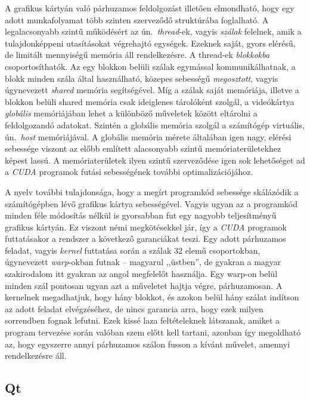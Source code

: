 \documentclass[a4paper,12pt]{article}
\begin{document}
A grafikus kártyán való párhuzamos feldolgozást illetően elmondható, hogy egy adott munkafolyamat több szinten szerveződő struktúrába foglalható.  A legalacsonyabb szintű működésért az ún.\ \emph{thread}-ek, vagyis \emph{szálak} felelnek, amik a tulajdonképpeni utasításokat végrehajtó egységek. Ezeknek saját, gyors elérésű, de limitált mennyiségű memória áll rendelkezésre. A thread-ek \emph{blokkokba} csoportosíthatók. Az egy blokkon belüli szálak egymással kommunikálhatnak, a blokk minden szála által használható, közepes sebességű \emph{megosztott}, vagyis úgynevezett \emph{shared} memória segítségével. Míg a szálak saját memóriája, illetve a blokkon belüli shared memória csak ideiglenes tárolóként szolgál, a videókártya \emph{globális} memóriájában lehet a különböző műveletek között eltárolni a feldolgozandó adatokat. Szintén a globális memória szolgál a számítógép virtuális, ún.\ \emph{host} memóriájával. A globális memória mérete általában igen nagy, elérési sebessége viszont az előbb említett alacsonyabb szintű memóriaterületekhez képest lassú. A memóriaterületek ilyen szintű szerveződése igen sok lehetőséget ad a \emph{CUDA} programok futási sebességének további optimalizációjához.

A nyelv további tulajdonsága, hogy a megírt programkód sebessége skálázódik a számítógépben lévő grafikus kártya sebességével. Vagyis ugyan az a programkód minden féle módosítás nélkül is gyorsabban fut egy nagyobb teljesítményű grafikus kártyán. Ez viszont némi megkötésekkel jár, így a \emph{CUDA} programok futtatásakor a rendszer a következő garanciákat teszi. Egy adott párhuzamos feladat, vagyis \emph{kernel} futtatása során a szálak 32 elemű csoportokban, úgynevezett \emph{warp}-okban futnak -- magyarul ,,üstben'', de gyakran a magyar szakirodalom itt gyakran az angol megfelelőt használja. Egy warp-on belül minden szál pontosan ugyan azt a műveletet hajtja végre, párhuzamosan. A kernelnek megadhatjuk, hogy hány blokkot, és azokon belül hány szálat indítson az adott feladat elvégzéséhez, de nincs garancia arra, hogy ezek milyen sorrendben fognak lefutni. Ezek kissé laza feltételeknek látszanak, amiket a program tervezése során valóban szem előtt kell tartani, azonban így megoldható az, hogy egyszerre annyi párhuzamos szálon fusson a kívánt művelet, amennyi rendelkezésre áll.

\subsection{Qt}
\end{document}
